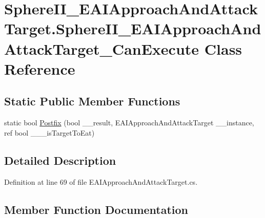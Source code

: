 \hypertarget{class_sphere_i_i___e_a_i_approach_and_attack_target_1_1_sphere_i_i___e_a_i_approach_and_attack_target___can_execute}{}\section{Sphere\+I\+I\+\_\+\+E\+A\+I\+Approach\+And\+Attack\+Target.\+Sphere\+I\+I\+\_\+\+E\+A\+I\+Approach\+And\+Attack\+Target\+\_\+\+Can\+Execute Class Reference}
\label{class_sphere_i_i___e_a_i_approach_and_attack_target_1_1_sphere_i_i___e_a_i_approach_and_attack_target___can_execute}
\subsection*{Static Public Member Functions}
\begin{DoxyCompactItemize}
\item 
static bool \mbox{\hyperlink{class_sphere_i_i___e_a_i_approach_and_attack_target_1_1_sphere_i_i___e_a_i_approach_and_attack_target___can_execute_a36d83345ae3a7e77dc3dea08e7c79418}{Postfix}} (bool \+\_\+\+\_\+result, E\+A\+I\+Approach\+And\+Attack\+Target \+\_\+\+\_\+instance, ref bool \+\_\+\+\_\+\+\_\+is\+Target\+To\+Eat)
\end{DoxyCompactItemize}


\subsection{Detailed Description}


Definition at line 69 of file E\+A\+I\+Approach\+And\+Attack\+Target.\+cs.



\subsection{Member Function Documentation}
\mbox{\label{class_sphere_i_i___e_a_i_approach_and_attack_target_1_1_sphere_i_i___e_a_i_approach_and_attack_target___can_execute_a36d83345ae3a7e77dc3dea08e7c79418}} 
